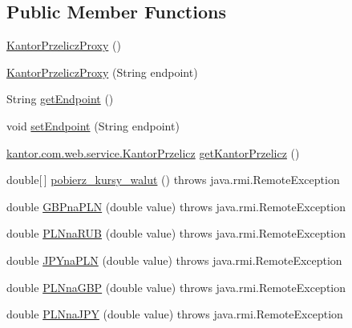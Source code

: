 \subsection*{Public Member Functions}
\begin{DoxyCompactItemize}
\item 
\hyperlink{classkantor_1_1com_1_1web_1_1service_1_1_kantor_przelicz_proxy_a11a96bae697b462d20db8fbc8b0bdbd4}{Kantor\+Przelicz\+Proxy} ()
\item 
\hyperlink{classkantor_1_1com_1_1web_1_1service_1_1_kantor_przelicz_proxy_a2a4e73b8a9302c1747ba75be35655986}{Kantor\+Przelicz\+Proxy} (String endpoint)
\item 
String \hyperlink{classkantor_1_1com_1_1web_1_1service_1_1_kantor_przelicz_proxy_aa15f2063604ca099ee2135bdfd3ad0a3}{get\+Endpoint} ()
\item 
void \hyperlink{classkantor_1_1com_1_1web_1_1service_1_1_kantor_przelicz_proxy_a4634c8f62799df6b19a7724abcee8e05}{set\+Endpoint} (String endpoint)
\item 
\hyperlink{classkantor_1_1com_1_1web_1_1service_1_1_kantor_przelicz}{kantor.\+com.\+web.\+service.\+Kantor\+Przelicz} \hyperlink{classkantor_1_1com_1_1web_1_1service_1_1_kantor_przelicz_proxy_a8fa481638a7cb75bb43f49f824054fe8}{get\+Kantor\+Przelicz} ()
\item 
double\mbox{[}$\,$\mbox{]} \hyperlink{classkantor_1_1com_1_1web_1_1service_1_1_kantor_przelicz_proxy_a7fa719bb81dec0293285538a0e421580}{pobierz\+\_\+kursy\+\_\+walut} ()  throws java.\+rmi.\+Remote\+Exception
\item 
double \hyperlink{classkantor_1_1com_1_1web_1_1service_1_1_kantor_przelicz_proxy_a11fcb67da28afd357d34f545754a9738}{G\+B\+Pna\+P\+L\+N} (double value)  throws java.\+rmi.\+Remote\+Exception
\item 
double \hyperlink{classkantor_1_1com_1_1web_1_1service_1_1_kantor_przelicz_proxy_aa2add2cb979600a2b325e4a9f91b8e7f}{P\+L\+Nna\+R\+U\+B} (double value)  throws java.\+rmi.\+Remote\+Exception
\item 
double \hyperlink{classkantor_1_1com_1_1web_1_1service_1_1_kantor_przelicz_proxy_aa8471360bfae3c5acb208c2724971c8b}{J\+P\+Yna\+P\+L\+N} (double value)  throws java.\+rmi.\+Remote\+Exception
\item 
double \hyperlink{classkantor_1_1com_1_1web_1_1service_1_1_kantor_przelicz_proxy_a580df822a271928481e22b7c7d79bfec}{P\+L\+Nna\+G\+B\+P} (double value)  throws java.\+rmi.\+Remote\+Exception
\item 
double \hyperlink{classkantor_1_1com_1_1web_1_1service_1_1_kantor_przelicz_proxy_a81e31cce00a952fc8c0781291b4023af}{P\+L\+Nna\+J\+P\+Y} (double value)  throws java.\+rmi.\+Remote\+Exception

\end{DoxyCompactItemize}
